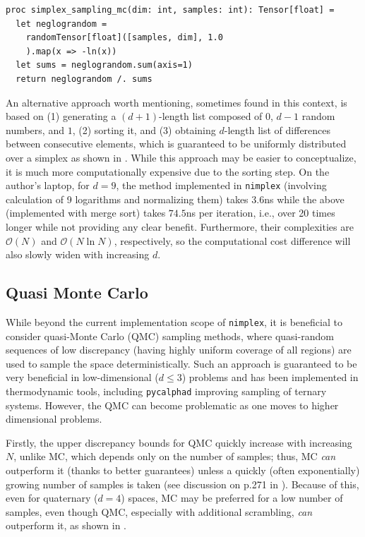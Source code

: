 \begin{verbatim}
proc simplex_sampling_mc(dim: int, samples: int): Tensor[float] =
  let neglograndom = 
    randomTensor[float]([samples, dim], 1.0
    ).map(x => -ln(x))
  let sums = neglograndom.sum(axis=1)
  return neglograndom /. sums
\end{verbatim}

An alternative approach worth mentioning, sometimes found in this context, is based on (1) generating a $(d+1)$-length list composed of $0$, $d-1$ random numbers, and $1$, (2) sorting it, and (3) obtaining $d$-length list of differences between consecutive elements, which is guaranteed to be uniformly distributed over a simplex as shown in \cite{Rubin1981TheBootstrap}. While this approach may be easier to conceptualize, it is much more computationally expensive due to the sorting step. On the author's laptop, for $d=9$, the method implemented in \texttt{nimplex} (involving calculation of 9 logarithms and normalizing them) takes $3.6$ns while the above (implemented with merge sort) takes $74.5$ns per iteration, i.e., over 20 times longer while not providing any clear benefit. Furthermore, their complexities are $\mathcal{O}(N)$ and $\mathcal{O}(N \ln N)$, respectively, so the computational cost difference will also slowly widen with increasing $d$. 


\subsection{Quasi Monte Carlo} \label{nimplex:ssec:qmc}
While beyond the current implementation scope of \texttt{nimplex}, it is beneficial to consider quasi-Monte Carlo (QMC) sampling methods, where quasi-random sequences of low discrepancy (having highly uniform coverage of all regions) are used to sample the space deterministically. Such an approach is guaranteed to be very beneficial in low-dimensional ($d\leq3$) problems and has been implemented in thermodynamic tools, including \texttt{pycalphad} \cite{Otis2017Pycalphad:Python, Otis2017AnSystems} improving sampling of ternary systems. However, the QMC can become problematic as one moves to higher dimensional problems. 

Firstly, the upper discrepancy bounds for QMC quickly increase with increasing $N$, unlike MC, which depends only on the number of samples; thus, MC \textit{can} outperform it (thanks to better guarantees) unless a quickly (often exponentially) growing number of samples is taken (see discussion on p.271 in \cite{Asmussen2007StochasticAnalysis}). Because of this, even for quaternary ($d=4$) spaces, MC may be preferred for a low number of samples, even though QMC, especially with additional scrambling, \textit{can} outperform it, as shown in \cite{Otis2017AnSystems}. 

